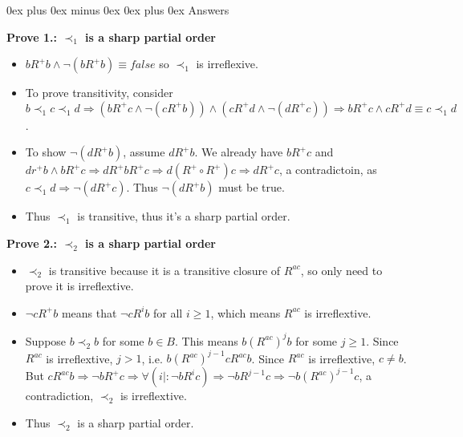\documentclass[letterpaper, 8pt]{extarticle}
\makeatletter
\renewcommand{\subsubsection}{\@startsection{subsubsection}{3}{0mm}%
                                {0ex plus 0ex minus 0ex}%
                                {0ex plus 0ex}%
                                {\normalfont\tiny\bfseries}}
\makeatother
\begin{document}
\begin{multicols*}{3}
    \subsubsection{Answers}

    \textbf{Prove 1.: $\prec_1$ is a sharp partial order}

    \begin{itemize}
        \item
              $bR^+b \land \lnot (b R^+ b) \equiv false$ so $\prec_1$ is irreflexive.
        \item
              To prove transitivity, consider $b \prec_1 c \prec_1 d \Rightarrow (bR^+ c \land \lnot (c R^+ b)) \land (c R^+ d \land \lnot (dR^+ c)) \Rightarrow b R^+ c \land c R^+ d \equiv c \prec_1 d$.
        \item
              To show $\lnot (d R^+ b)$, assume $d R^+ b$. We already have $bR^+c$ and $dr^+b \land bR^+c \Rightarrow dR^+ bR^+ c \Rightarrow d(R^+ \circ R^+) c \Rightarrow dR^+c$, a contradictoin, as $c \prec_1 d \Rightarrow \lnot (dR^+ c)$. Thus $\lnot (dR^+b)$ must be true.
        \item
              Thus $\prec_1$ is transitive, thus it's a sharp partial order.
    \end{itemize}

    \textbf{Prove 2.: $\prec_2$ is a sharp partial order}
    \begin{itemize}
        \item
              $\prec_2$ is transitive because it is a transitive closure of $R^{ac}$, so only need to prove it is irreflextive.
        \item
              $\lnot c R^+ b$ means that $\lnot cR^ib$ for all $i \ge 1$, which means $R^{ac}$ is irreflextive.
        \item
              Suppose $b \prec_2 b$ for some $b \in B$. This means $b(R^{ac})^j b$ for some $j \ge 1$. Since $R^{ac}$ is irreflextive, $j > 1$, i.e. $b(R^{ac})^{j-1} cR^{ac} b$. Since $R^{ac}$ is irreflextive, $c \ne b$. But $cR^{ac}b \Rightarrow \lnot b R^+ c \Rightarrow \forall (i \mid : \lnot b R^i c) \Rightarrow \lnot bR^{j-1} c \Rightarrow \lnot b(R^{ac})^{j-1} c$, a contradiction, $\prec_2$ is irreflextive.
        \item
              Thus $\prec_2$ is a sharp partial order.
    \end{itemize}


\end{multicols*}
\end{document}
